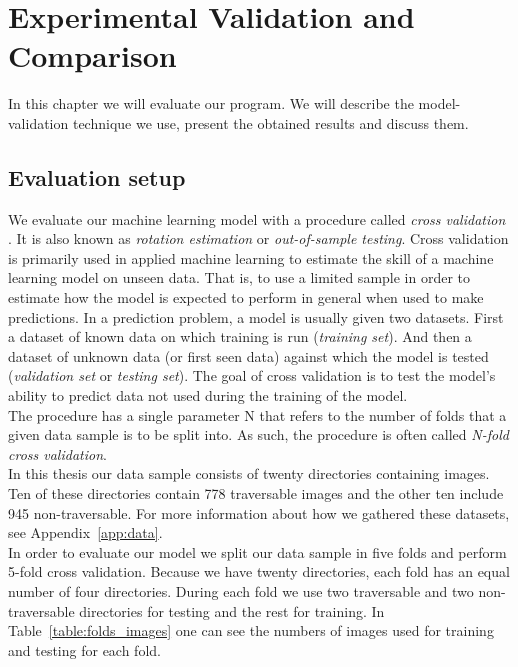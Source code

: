 \documentclass[12pt,a4paper,table,dvipsnames,tikz]{report}
\newcommand{\term}{\textit}
\newcommand{\bl}[1]{{\hypersetup{linkcolor=blue}#1}}
\begin{document}
	
	\chapter{Experimental Validation and Comparison}
	\label{sec:exp}
	
	In this chapter we will evaluate our program. We will describe the model-validation 
	technique we use, present the obtained results and discuss them.
	\\
	
	\section{Evaluation setup}
	\label{sec:exp:eval}
	
	We evaluate our machine learning model with a procedure called \term{cross validation} 
	\citep{Brownlee}. It is also known as \term{rotation estimation} or \term{out-of-sample 
	testing}. Cross validation is primarily used in applied machine learning to estimate 
	the skill of a machine learning model on unseen data. That is, to use a limited sample 
	in order to estimate how the model is expected to perform in general when used to make 
	predictions. In a prediction problem, a model is usually given two datasets. First a 
	dataset of known data on which training is run (\term{training set}). And then a dataset 
	of unknown data (or first seen data) against which the model is tested (\term{validation 
	set} or \term{testing set}). The goal of cross validation is to test the model's ability 
	to predict data not used during the training of the model.
	\\
	
	The procedure has a single parameter N that refers to the number of folds that a given 
	data sample is to be split into. As such, the procedure is often called \term{N-fold 
	cross validation}.
	\\
	
	In this thesis our data sample consists of twenty directories containing images. 
	Ten of these directories contain 778 traversable images and the other ten include 
	945 non-traversable. For more information about how we gathered these datasets, see 
	Appendix~\ref{app:data}.
	\\
	
	In order to evaluate our model we split our data sample in five folds and perform 
	5-fold cross validation. Because we have twenty directories, each fold has an equal 
	number of four directories. During each fold we use two traversable and two non-traversable 
	directories for testing and the rest for training. In Table~\bl{\ref{table:folds_images}} 
	one can see the numbers of images used for training and testing for each fold.
	\\
	
\end{document}
